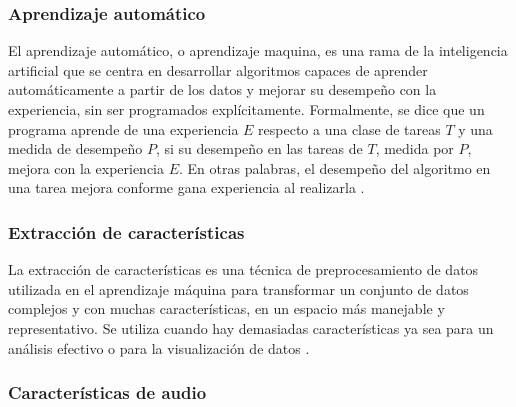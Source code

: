 \subsubsection{Aprendizaje automático}
El aprendizaje automático, o aprendizaje maquina, es una rama de la inteligencia artificial que se centra en desarrollar algoritmos capaces de aprender automáticamente a partir de los datos y mejorar su desempeño con la experiencia, sin ser programados explícitamente. Formalmente, se dice que un programa aprende de una experiencia $E$ respecto a una clase de tareas $T$ y una medida de desempeño $P$, si su desempeño en las tareas de $T$, medida por $P$, mejora con la experiencia $E$. En otras palabras, el desempeño del algoritmo en una tarea mejora conforme gana experiencia al realizarla \cite{mitchell1997machine}.


\subsubsection{Extracción de características}
La extracción de características es una técnica de preprocesamiento de datos utilizada en el aprendizaje máquina para transformar un conjunto de datos complejos y con muchas características, en un espacio más manejable y representativo. Se utiliza cuando hay demasiadas características ya sea para un análisis efectivo o para la visualización de datos \cite{richer_coelho_2013}.

\subsubsection{Características de audio}

